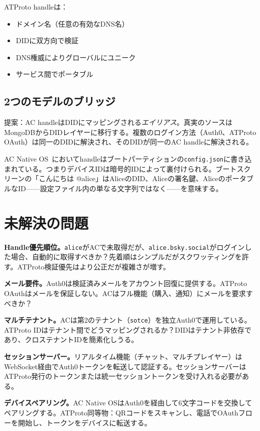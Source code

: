 \documentclass[10pt,letterpaper,twocolumn]{article}
\begin{document}
ATProto handleは：
\begin{itemize}
  \item ドメイン名（任意の有効なDNS名）
  \item DIDに双方向で検証
  \item DNS権威によりグローバルにユニーク
  \item サービス間でポータブル
\end{itemize}

\subsection{2つのモデルのブリッジ}

提案：AC handleはDIDにマッピングされる\emph{エイリアス}。真実のソースはMongoDBからDIDレイヤーに移行する。複数のログイン方法（Auth0、ATProto OAuth）は同一のDIDに解決され、そのDIDが同一のAC handleに解決される。

AC Native OS~\citep{scudder2026os}においてhandleはブートパーティションの\texttt{config.json}に書き込まれている。つまりデバイスIDは暗号的IDによって裏付けられる。ブートスクリーンの「こんにちは @alice」はAliceのDID、Aliceの署名鍵、AliceのポータブルなID——設定ファイル内の単なる文字列ではなく——を意味する。


\section{未解決の問題}
\label{sec:questions}

\textbf{Handle優先順位。}\texttt{alice}がACで未取得だが、\texttt{alice.bsky.social}がログインした場合、自動的に取得すべきか？先着順はシンプルだがスクワッティングを許す。ATProto検証優先はより公正だが複雑さが増す。

\textbf{メール要件。}Auth0は検証済みメールをアカウント回復に提供する。ATProto OAuthはメールを保証しない。ACはフル機能（購入、通知）にメールを要求すべきか？

\textbf{マルチテナント。}ACは第2のテナント（\texttt{sotce}）を独立Auth0で運用している。ATProto IDはテナント間でどうマッピングされるか？DIDはテナント非依存であり、クロステナントIDを簡素化しうる。

\textbf{セッションサーバー。}リアルタイム機能（チャット、マルチプレイヤー）はWebSocket経由でAuth0トークンを転送して認証する。セッションサーバーはATProto発行のトークンまたは統一セッショントークンを受け入れる必要がある。

\textbf{デバイスペアリング。}AC Native OSはAuth0を経由して6文字コードを交換してペアリングする。ATProto同等物：QRコードをスキャンし、電話でOAuthフローを開始し、トークンをデバイスに転送する。
\end{document}
